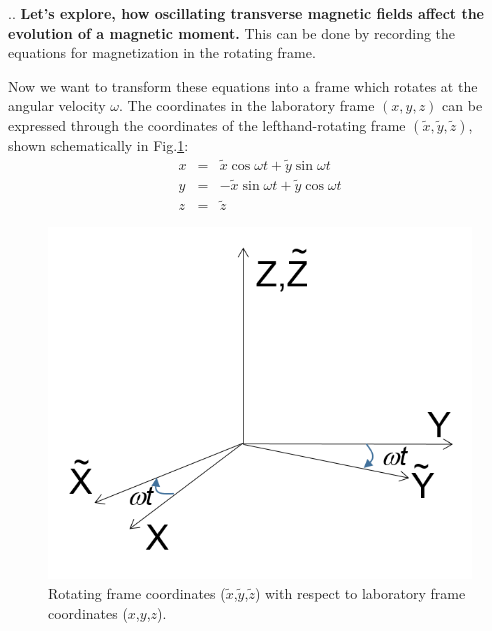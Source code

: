 \documentclass{beamer}
\begin{document}
\begin{frame}[shrink=5]{\thesection.\thesubsection. \insertsubsection}
  \textbf{ Let's explore, how oscillating transverse magnetic fields affect the evolution of a magnetic moment.}
  This can be done by recording the equations for magnetization in the \alert{rotating frame}.
	
  
  Now we  want to transform these equations into a frame which rotates at the angular velocity $\omega$.  The coordinates in the laboratory frame $(x,y,z)$ can be expressed through the coordinates of the lefthand-rotating frame $(\tilde{x}, \tilde{y}, \tilde{z})$, shown schematically in Fig.\ref{fig:rot_frame}:
 \begin{equation}
 \begin{array}{lcl}
 x &=& \tilde{x} \cos \omega t + \tilde{y} \sin \omega t \\
 y &=& -\tilde{x} \sin \omega t + \tilde{y} \cos \omega t \\
 z &=& \tilde{z}
 \end{array}
 \end{equation}
 
  \begin{figure}[ht] 
  	\caption{Rotating frame coordinates ($\tilde{x}$,$\tilde{y}$,$\tilde{z}$) with respect to laboratory frame coordinates ($x$,$y$,$z$). }
  	\label{fig:rot_frame}
  	\centering
  	\includegraphics[scale=0.3]{figures/rotating_frame.png}
  \end{figure}
\end{frame}
\end{document}
